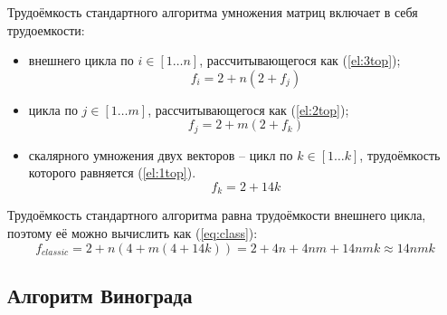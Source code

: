 Трудоёмкость стандартного алгоритма умножения матриц включает в себя трудоемкости:
\begin{itemize}
	\item внешнего цикла по $i \in [1 \dots n]$, рассчитывающегося как (\ref{el:3top});
        \begin{equation}
            \label{el:3top}
            f_{i} = 2 + n(2 + f_{j})
        \end{equation}
	\item цикла по $j \in [1 \dots m]$, рассчитывающегося как (\ref{el:2top});
        \begin{equation}
            \label{el:2top}
            f_{j} = 2 + m(2 + f_{k})
        \end{equation}
	\item скалярного умножения двух векторов -- цикл по $k \in [1 \dots k]$, трудоёмкость которого равняется (\ref{el:1top}).
        \begin{equation}
            \label{el:1top}
            f_{k} = 2 + 14k
        \end{equation}
\end{itemize}

Трудоёмкость стандартного алгоритма равна трудоёмкости внешнего цикла, поэтому её можно вычислить как (\ref{eq:class}):
\begin{equation}
	\label{eq:class}
	f_{classic} = 2 + n(4 + m(4 + 14k)) = 2 + 4n + 4nm + 14nmk \approx 14nmk
\end{equation}

\subsection{Алгоритм Винограда}

